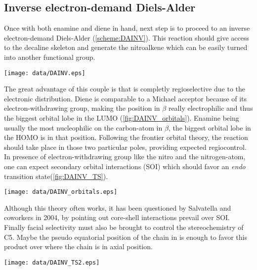 \subsection*{Inverse electron-demand Diels-Alder}
Once with both enamine  and diene  in hand, next step is to proceed to an inverse electron-demand Diels-Alder (\ref{scheme:DAINV}). This reaction should give access to the decaline skeleton and generate the nitroalkene  which can be easily turned into another functional group.
\begin{figure''}
\centering
		\texttt{[image: data/DAINV.eps]}		
    \label{scheme:DAINV}
\end{figure''}
The great advantage of this couple is that is completly regioselective due to the electronic distribution. Diene is comparable to a Michael acceptor because of its electron-withdrawing group, making the position in $\beta$ really electrophilic and thus the biggest orbital lobe in the LUMO (\ref{fig:DAINV_orbitals}). Enamine being usually the most nucleophilic on the carbon-atom in $\beta$, the biggest orbital lobe in the HOMO is in that position. Following the frontier orbital theory, the reaction should take place in those two particular poles, providing expected regiocontrol.
In presence of electron-withdrawing group like the nitro and the nitrogen-atom, one can expect secondary orbital interactions (SOI) which should favor an \textit{endo} transition state\autocite{Xu17}(\ref{fig:DAINV_TS}).
\begin{figure''}
\centering
		\texttt{[image: data/DAINV\_orbitals.eps]}	
        \label{fig:DAINV_orbitals}
\end{figure''}
Although this theory often works, it has been questioned  by Salvatella and coworkers in 2004\autocite{Salvatella04}, by pointing out core-shell interactions prevail over SOI. Finally facial selectivity must also be brought to control the stereochemistry of C5. Maybe the pseudo equatorial position of the chain in  is enough to favor this product over  where the chain is in axial position.
\begin{figure''}
\centering
		\texttt{[image: data/DAINV\_TS2.eps]}	
        \label{fig:DAINV_TS}
\end{figure''}
